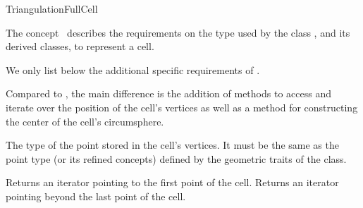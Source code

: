 \begin{ccRefConcept}{TriangulationFullCell}

\ccDefinition

The concept \ccRefName\ describes the requirements on the type used by the
class , and its derived classes, to
represent a cell.

\ccRefines


We only list below the additional specific requirements of \ccRefName.

Compared to , the main difference is the addition of
methods to access and iterate over the position of the cell's vertices as
well as a method for constructing the center of the cell's circumsphere.

\ccHasModels


\ccTypes

%
{The type of the point stored in the cell's vertices. It must be the same
as the point type  (or its refined concepts)
defined by the geometric traits of the 
class.}



\ccOperations

{Returns an iterator pointing to the first point of the cell.}
\ccGlue
{}
{Returns an iterator pointing beyond the last point of the cell.}


\ccSeeAlso

\\
\\

\end{ccRefConcept}

